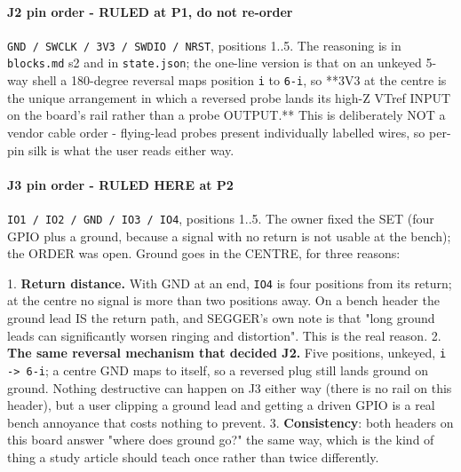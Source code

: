 \documentclass[11pt,a4paper]{article}
\begin{document}
\paragraph*{J2 pin order - RULED at P1, do not re-order}
\texttt{GND / SWCLK / 3V3 / SWDIO / NRST}, positions 1..5. The reasoning is in \texttt{blocks.md} s2 and in \texttt{state.json}; the one-line version is that on an unkeyed 5-way shell a 180-degree reversal maps position \texttt{i} to \texttt{6-i}, so {*}{*}3V3 at the centre is the unique arrangement in which a reversed probe lands its high-Z VTref INPUT on the board's rail rather than a probe OUTPUT.{*}{*} This is deliberately NOT a vendor cable order - flying-lead probes present individually labelled wires, so per-pin silk is what the user reads either way.

\paragraph*{J3 pin order - RULED HERE at P2}
\texttt{IO1 / IO2 / GND / IO3 / IO4}, positions 1..5. The owner fixed the SET (four GPIO plus a ground, because a signal with no return is not usable at the bench); the ORDER was open. Ground goes in the CENTRE, for three reasons:

1. \textbf{Return distance.} With GND at an end, \texttt{IO4} is four positions from its return; at the centre no signal is more than two positions away. On a bench header the ground lead IS the return path, and SEGGER's own note is that "long ground leads can significantly worsen ringing and distortion". This is the real reason. 2. \textbf{The same reversal mechanism that decided J2.} Five positions, unkeyed, \texttt{i -\textgreater{} 6-i}; a centre GND maps to itself, so a reversed plug still lands ground on ground. Nothing destructive can happen on J3 either way (there is no rail on this header), but a user clipping a ground lead and getting a driven GPIO is a real bench annoyance that costs nothing to prevent. 3. \textbf{Consistency}: both headers on this board answer "where does ground go?" the same way, which is the kind of thing a study article should teach once rather than twice differently.
\end{document}
